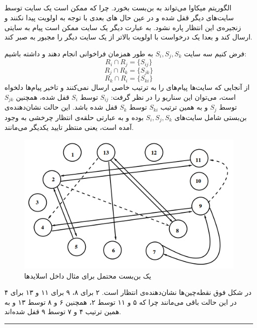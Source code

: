 \documentclass{article}
\begin{document}
\begin{multicols}{2}
\section{}
الگوریتم میکاوا می‌تواند به بن‌بست بخورد. چرا که ممکن است یک سایت توسط سایت‌های دیگر قفل شده و در عین حال
های بعدی با توجه به
اولویت پیدا نکنند و زنجیره‌ی این انتظار پاره نشود. به عبارت دیگر یک سایت ممکن است پیام
به سایتی ارسال کند و بعدا یک درخواست با اولویت بالاتر از یک سایت دیگر را مجبور به صبر کند.

فرض کنیم سه سایت
$S_i, S_j, S_k$
به طور همزمان فراخوانی انجام دهند و داشته باشیم:
$$R_i \cap R_j = \{ S_{ij} \}$$
$$R_j \cap R_k = \{ S_{jk} \}$$
$$R_k \cap R_i = \{ S_{ki} \}$$
از آنجایی که سایت‌ها پیام‌های
را به ترتیب خاصی ارسال نمی‌کنند و تاخیر پیام‌ها دلخواه است، می‌توان این سناریو را در نظر گرفت:
$S_{ij}$
توسط
$S_i$
قفل شده، همچنین
$S_{jk}$
توسط
$S_j$
و به همین ترتیب
$S_{ki}$
توسط
$S_k$
قفل شده باشد. این حالت نشان‌دهنده‌ی بن‌بستی شامل سایت‌های
$S_i, S_j, S_k$
بوده و به عبارتی حلقه‌ی انتظار چرخشی به وجود آمده است، یعنی منتظر تایید یکدیگر می‌مانند.
\begin{figure}[H]
    \centering
    \includegraphics[width=0.90\linewidth]{Photos/HW7/deadlock.png}
    \caption{
    یک بن‌بست محتمل برای مثال داخل اسلایدها
    }
    \label{fig:my_label}
\end{figure}
در شکل فوق نقطه‌چین‌ها نشان‌دهنده‌ی انتظار است. ۲ برای ۸، ۹ برای ۱۱ و ۱۳ برای ۴ در این حالت باقی می‌مانند چرا که ۵ و ۱۱ توسط ۲، همچنین ۶ و ۸ توسط ۱۳ و به همین ترتیب ۴ و ۷ توسط ۹ قفل شده‌اند.\\
\rule{\linewidth}{1pt}

\end{multicols}
\end{document}
